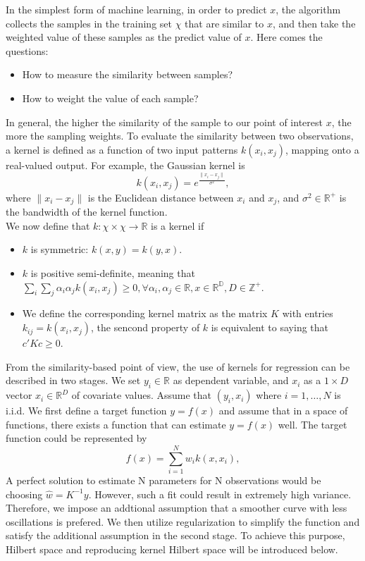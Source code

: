 In the simplest form of machine learning, in order to predict $x$, the algorithm collects the samples in the training set $\chi$ that are similar to $x$, 
and then take the weighted value of these samples as the predict value of $x$. Here comes the questions:
\begin{itemize}
    \item How to measure the similarity between samples?
    \item How to weight the value of each sample?
\end{itemize} 
In general, the higher the similarity of the sample to our point of interest $x$, the more the sampling weights. To evaluate the similarity between two observations, 
a kernel is defined as a function of two input patterns $k(x_i, x_j)$, mapping onto a real-valued output. For example, the Gaussian kernel is
\begin{equation}
    k(x_i, x_j) = e^\frac{\parallel x_i - x_j \parallel}{\sigma^2},
\end{equation}
where $\parallel x_i - x_j \parallel$ is the Euclidean distance between $x_i$ and $x_j$, and $\sigma^2 \in \mathbb{R}^+$ is the bandwidth of the kernel function.\\
We now define that $k: \chi \times \chi \rightarrow \mathbb{R}$ is a kernel if
\begin{itemize}
    \item $k$ is symmetric: $k(x,y) = k(y,x)$.
    \item $k$ is positive semi-definite, meaning that $\sum_{i} \sum_{j} \alpha_i \alpha_j k(x_i,x_j)\geq0, \forall \alpha_i, \alpha_j \in \mathbb{R}, x \in \mathbb{R}^\mathbb{D}, D \in \mathbb{Z}^+$. 
    \item We define the corresponding kernel matrix as the matrix $K$ with entries $k_{ij}=k(x_i,x_j)$, the sencond property of $k$ is equivalent to saying that $c'Kc \geq0$.
\end{itemize}
From the similarity-based point of view, the use of kernels for regression can be described in two stages. We set $y_i \in \mathbb{R}$ as dependent variable, 
and $x_i$ as a $1 \times D$ vector $x_i \in \mathbb{R}^D$ of covariate values. Assume that $(y_i, x_i)$ where $i = 1, \dots, N$ is i.i.d. We first define a target function $y=f(x)$ and assume that in a space of functions, there exists 
a function that can estimate $y=f(x)$ well. The target function could be represented by
\begin{equation}
    f(x)= \sum_{i=1}^N w_i k(x,x_i),
\end{equation}
A perfect solution to estimate N parameters for N observations would be choosing $\hat{w}=K^{-1}y$. However, such a fit could result in extremely high variance. Therefore, we impose an addtional assumption 
that a smoother curve with less oscillations is prefered. We then utilize regularization to simplify the function and satisfy the additional assumption in 
the second stage. To achieve this purpose, Hilbert space and reproducing kernel Hilbert space will be introduced below.



